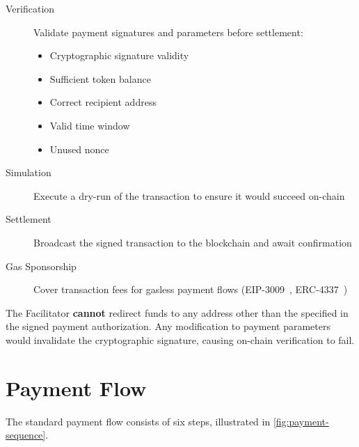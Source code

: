 \begin{description}
    \item[Verification] Validate payment signatures and parameters before settlement:
    \begin{itemize}
        \item Cryptographic signature validity
        \item Sufficient token balance
        \item Correct recipient address
        \item Valid time window
        \item Unused nonce
    \end{itemize}

    \item[Simulation] Execute a dry-run of the transaction to ensure it would succeed on-chain

    \item[Settlement] Broadcast the signed transaction to the blockchain and await confirmation

    \item[Gas Sponsorship] Cover transaction fees for gasless payment flows (EIP-3009~\cite{eip3009}, ERC-4337~\cite{eip4337})
\end{description}

\begin{securitybox}
The Facilitator \textbf{cannot} redirect funds to any address other than the  specified in the signed payment authorization. Any modification to payment parameters would invalidate the cryptographic signature, causing on-chain verification to fail.
\end{securitybox}

\section{Payment Flow}
\label{sec:payment-flow}

The standard \tprotocol{} payment flow consists of six steps, illustrated in \cref{fig:payment-sequence}.

